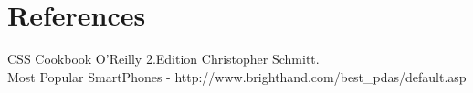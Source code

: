 \newpage
\section{References}
CSS Cookbook O'Reilly 2.Edition Christopher Schmitt. \\
Most Popular SmartPhones - http://www.brighthand.com/best\_pdas/default.asp \\
